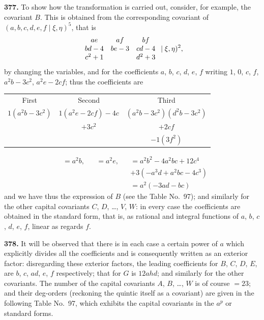 \documentclass[12pt,a4paper]{article}
\begin{document}
\medskip

\noindent\textbf{377.} To show how the transformation is carried out, consider, for example, the covariant $B$. This is obtained from the corresponding covariant of $(a, b, c, d, e, f \mid \xi, \eta)^5$, that is
\[
\begin{array}{c@{\quad}c@{\quad}c}
ae & af & bf \\
bd - 4 & be - 3 & cd - 4 \\
c^2 + 1 & & d^2 + 3
\end{array} \mid \xi, \eta)^2,
\]
by changing the variables, and for the coefficients $a$, $b$, $c$, $d$, $e$, $f$ writing $1$, $0$, $c$, $f$, $a^2 b - 3c^2$, $a^2 e - 2cf$; thus the coefficients are
\begin{center}
\begin{tabular}{c@{\quad}c@{\quad}c}
First & Second & Third \\[2pt]
$1(a^2 b - 3c^2)$ & $1(a^2 e - 2cf) - 4c$ & $(a^2 b - 3c^2)(d^2 b - 3c^2)$ \\
& $+ 3c^2$ & $+ 2cf$ \\
& & $- 1(3f^2)$
\end{tabular}
\end{center}
\begin{align*}
&= a^2 b, &&= a^2 e, &&= a^2 b^2 - 4a^2 bc + 12c^4 \\
& && && + 3(-a^3 d + a^2 bc - 4c^3) \\
& && && = a^2(-3ad - bc)
\end{align*}
and we have thus the expression of $B$ (see the Table No.~97); and similarly for the other capital covariants $C$, $D$, \ldots, $V$, $W$: in every case the coefficients are obtained in the standard form, that is, as rational and integral functions of $a$, $b$, $c$, $d$, $e$, $f$, linear as regards $f$.

\medskip

\noindent\textbf{378.} It will be observed that there is in each case a certain power of $a$ which explicitly divides all the coefficients and is consequently written as an exterior factor: disregarding these exterior factors, the leading coefficients for $B$, $C$, $D$, $E$, are $b$, $c$, $ad$, $e$, $f$ respectively; that for $G$ is $12ahd$; and similarly for the other covariants. The number of the capital covariants $A$, $B$, \ldots, $W$ is of course $=23$; and their deg-orders (reckoning the quintic itself as a covariant) are given in the following Table No.~97, which exhibits the capital covariants in the $a^p$ or standard forms.
\end{document}
